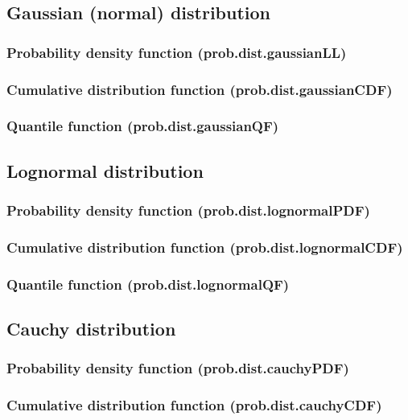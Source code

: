 \documentclass{article}
\theoremstyle{definition}
\begin{document}
\subsection{Gaussian (normal) distribution}
\subsubsection{Probability density function (prob.dist.gaussianLL)}
\subsubsection{Cumulative distribution function (prob.dist.gaussianCDF)}
\subsubsection{Quantile function (prob.dist.gaussianQF)}

\subsection{Lognormal distribution}
\subsubsection{Probability density function (prob.dist.lognormalPDF)}
\subsubsection{Cumulative distribution function (prob.dist.lognormalCDF)}
\subsubsection{Quantile function (prob.dist.lognormalQF)}

\subsection{Cauchy distribution}
\subsubsection{Probability density function (prob.dist.cauchyPDF)}
\subsubsection{Cumulative distribution function (prob.dist.cauchyCDF)}
\end{document}
